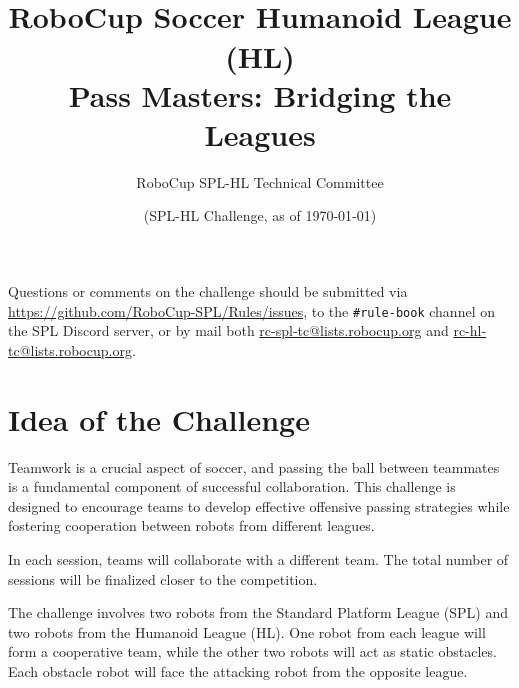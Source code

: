 \documentclass[12pt]{article}
\title{\leaguename\\RoboCup Soccer Humanoid League (HL)
\\Pass Masters: Bridging the Leagues}
\author{RoboCup SPL-HL Technical Committee}
\date{(\RCYear SPL-HL Challenge, as of \today)}
\begin{document}
\maketitle
\thispagestyle{empty}

\begin{center}
Questions or comments on the challenge should be submitted via \url{https://github.com/RoboCup-SPL/Rules/issues}, to the \texttt{\#rule-book} channel on the SPL Discord server, or by mail both \url{rc-spl-tc@lists.robocup.org} and \url{rc-hl-tc@lists.robocup.org}.
\end{center}

\newpage


\thispagestyle{fancy}

\clearpage

\cfoot{\thepage}
\setcounter{page}{1}


\section{Idea of the Challenge}
Teamwork is a crucial aspect of soccer, and passing the ball between teammates is a fundamental component of successful collaboration.
This challenge is designed to encourage teams to develop effective offensive passing strategies while fostering cooperation between robots from different leagues.

In each session, teams will collaborate with a different team.
The total number of sessions will be finalized closer to the competition.

The challenge involves two robots from the Standard Platform League (SPL) and two robots from the Humanoid League (HL).
One robot from each league will form a cooperative team, while the other two robots will act as static obstacles.
Each obstacle robot will face the attacking robot from the opposite league. 
\end{document}
